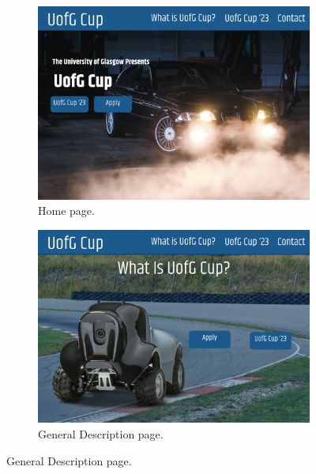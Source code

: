 \documentclass{l4proj}
\begin{document}
\begin{appendices}
\begin{figure}
    \begin{subfigure}{0.49\textwidth}
        \centering
        \includegraphics[width=\textwidth]{images/Home.pdf}
        \caption{Home page.}
        \label{fig:web-home-page}  
    \end{subfigure}
    \begin{subfigure}{0.49\textwidth}
        \centering
        \includegraphics[width=\textwidth]{images/What is UofG Cup_.pdf}
        \caption{General Description page.}
        \label{fig:web-gen-desc-page}  
    \end{subfigure}
    

\end{figure}
\end{appendices}
\end{document}
